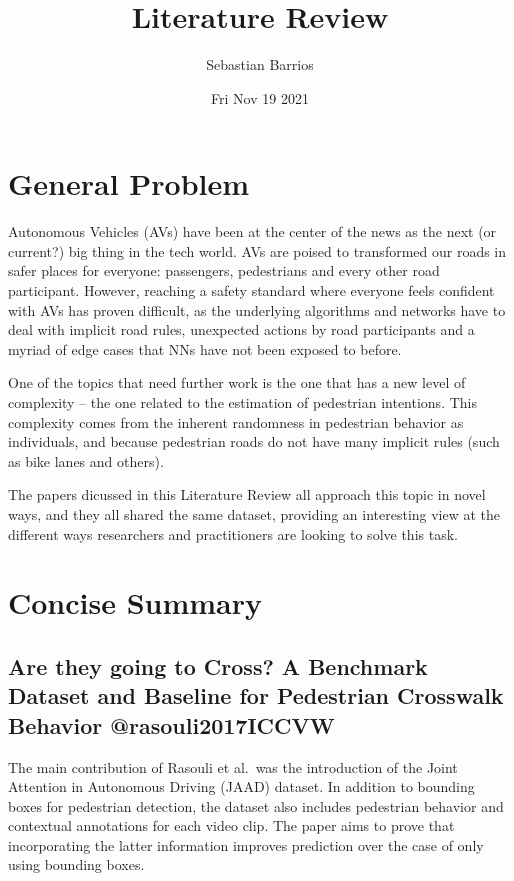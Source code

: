 \documentclass[
]{article}
\title{Literature Review}
\author{Sebastian Barrios}
\date{Fri Nov 19 2021}
\begin{document}
\maketitle

\hypertarget{general-problem}{%
\section{General Problem}\label{general-problem}}

Autonomous Vehicles (AVs) have been at the center of the news as the
next (or current?) big thing in the tech world. AVs are poised to
transformed our roads in safer places for everyone: passengers,
pedestrians and every other road participant. However, reaching a safety
standard where everyone feels confident with AVs has proven difficult,
as the underlying algorithms and networks have to deal with implicit
road rules, unexpected actions by road participants and a myriad of edge
cases that NNs have not been exposed to before.

One of the topics that need further work is the one that has a new level
of complexity -- the one related to the estimation of pedestrian
intentions. This complexity comes from the inherent randomness in
pedestrian behavior as individuals, and because pedestrian roads do not
have many implicit rules (such as bike lanes and others).

The papers dicussed in this Literature Review all approach this topic in
novel ways, and they all shared the same dataset, providing an
interesting view at the different ways researchers and practitioners are
looking to solve this task.

\hypertarget{concise-summary}{%
\section{Concise Summary}\label{concise-summary}}

\hypertarget{are-they-going-to-cross-a-benchmark-dataset-and-baseline-for-pedestrian-crosswalk-behavior-rasouli2017iccvw}{%
\subsection{Are they going to Cross? A Benchmark Dataset and Baseline
for Pedestrian Crosswalk Behavior
@rasouli2017ICCVW}\label{are-they-going-to-cross-a-benchmark-dataset-and-baseline-for-pedestrian-crosswalk-behavior-rasouli2017iccvw}}

The main contribution of Rasouli et al.~was the introduction of the
Joint Attention in Autonomous Driving (JAAD) dataset. In addition to
bounding boxes for pedestrian detection, the dataset also includes
pedestrian behavior and contextual annotations for each video clip. The
paper aims to prove that incorporating the latter information improves
prediction over the case of only using bounding boxes.
\end{document}
